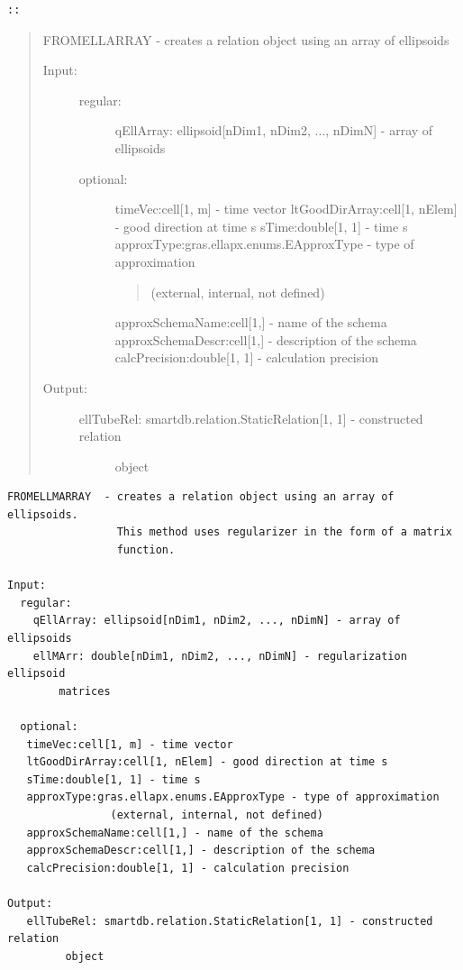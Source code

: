 \documentclass[letterpaper,10pt,english]{sphinxmanual}
\begin{document}
\begin{Verbatim}[commandchars=\\\{\}]
::
\end{Verbatim}
\begin{quote}

FROMELLARRAY  - creates a relation object using an array of ellipsoids
\begin{description}
\item[{Input:}] \leavevmode\begin{description}
\item[{regular:}] \leavevmode
qEllArray: ellipsoid{[}nDim1, nDim2, ..., nDimN{]} - array of ellipsoids

\item[{optional:}] \leavevmode
timeVec:cell{[}1, m{]} - time vector
ltGoodDirArray:cell{[}1, nElem{]} - good direction at time s
sTime:double{[}1, 1{]} - time s
approxType:gras.ellapx.enums.EApproxType - type of approximation
\begin{quote}

(external, internal, not defined)
\end{quote}

approxSchemaName:cell{[}1,{]} - name of the schema
approxSchemaDescr:cell{[}1,{]} - description of the schema
calcPrecision:double{[}1, 1{]} - calculation precision

\end{description}

\item[{Output:}] \leavevmode\begin{description}
\item[{ellTubeRel: smartdb.relation.StaticRelation{[}1, 1{]} - constructed relation}] \leavevmode
object

\end{description}

\end{description}
\end{quote}

\begin{Verbatim}[commandchars=\\\{\}]
FROMELLMARRAY  - creates a relation object using an array of ellipsoids.
                 This method uses regularizer in the form of a matrix
                 function.

Input:
  regular:
    qEllArray: ellipsoid[nDim1, nDim2, ..., nDimN] - array of ellipsoids
    ellMArr: double[nDim1, nDim2, ..., nDimN] - regularization ellipsoid
        matrices

  optional:
   timeVec:cell[1, m] - time vector
   ltGoodDirArray:cell[1, nElem] - good direction at time s
   sTime:double[1, 1] - time s
   approxType:gras.ellapx.enums.EApproxType - type of approximation
                (external, internal, not defined)
   approxSchemaName:cell[1,] - name of the schema
   approxSchemaDescr:cell[1,] - description of the schema
   calcPrecision:double[1, 1] - calculation precision

Output:
   ellTubeRel: smartdb.relation.StaticRelation[1, 1] - constructed relation
         object
\end{Verbatim}
\end{document}
